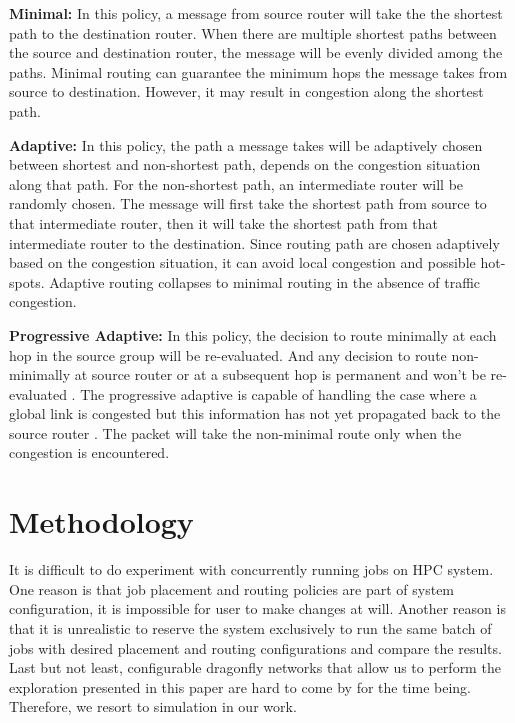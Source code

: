 \documentclass[conference,compsoc]{IEEEtran}
\begin{document}
\textbf{Minimal:} In this policy, a message from source router will take the the shortest path to the destination router. When there are multiple shortest paths between the source and destination router, the message will be evenly divided among the paths. Minimal routing can guarantee the minimum hops the message takes from source to destination. However, it may result in congestion along the shortest path. 


\textbf{Adaptive:} In this policy, the path a message takes will be adaptively chosen between shortest and non-shortest path, depends on the congestion situation along that path. For the non-shortest path, an intermediate router will be randomly chosen. The message will first take the shortest path from source to that intermediate router, then it will take the shortest path from that intermediate router to the destination. Since routing path are chosen adaptively based on the congestion situation, it can avoid local congestion and possible hot-spots. Adaptive routing collapses to minimal routing in the absence of traffic congestion. 

\textbf{Progressive Adaptive:} In this policy, the decision to route minimally at each hop in the source group will be re-evaluated. And any decision to route non-minimally at source router or at a subsequent hop is permanent and won't be re-evaluated \cite{jiang}. The progressive adaptive is capable of handling the case where a global link is congested but this information has not yet propagated back to the source router \cite{jiang}. The packet will take the non-minimal route only when the congestion is encountered. 



\section{Methodology}
\label{sec: methodology}

It is difficult to do experiment with concurrently running jobs on HPC system\cite{zhou-ipdps-2015}\cite{jain-sc14}\cite{bhatele-sc11}\cite{jokanovic-ipdps-2015}. One reason is that job placement and routing policies are part of system configuration, it is impossible for user to make changes at will. Another reason is that it is unrealistic to reserve the system exclusively to run the same batch of jobs with desired placement and routing configurations and compare the results. Last but not least, configurable dragonfly networks that allow us to perform the exploration presented in this paper are hard to come by for the time being. Therefore, we resort to simulation in our work.
\end{document}
